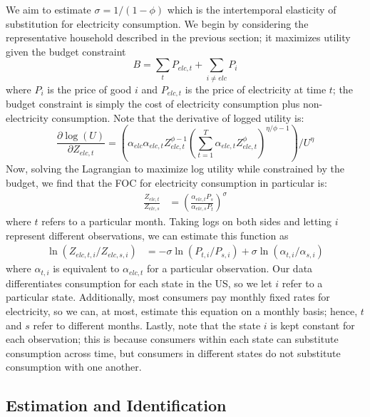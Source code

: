 \documentclass[12pt,a4paper]{extarticle}
\begin{document}
We aim to estimate $\sigma = 1/(1-\phi)$ which is the intertemporal elasticity of substitution for electricity consumption. We begin by considering the representative household described in the previous section; it maximizes utility given the budget constraint 
$$B = \sum_t P_{elc,t} + \sum_{i \neq elc} P_i $$
where $P_i$ is the price of good $i$ and $P_{elc,t}$ is the price of electricity at time $t$; the budget constraint is simply the cost of electricity consumption plus non-electricity consumption. Note that the derivative of logged utility is:
$$ \frac{\partial \log(U)}{\partial Z_{elc,t}} = \left( \alpha_{elc} \alpha_{elc,t} Z_{elc,t}^{\phi - 1}  \left( \sum_{t=1}^T \alpha_{elc,t} Z_{elc, t}^\phi \right)^{\eta/\phi -1} \right) / U^\eta$$
Now, solving the Lagrangian to maximize log utility while constrained by the budget, we find that the FOC for electricity consumption in particular is:
\begin{align*}\frac{Z_{elc, t}}{ Z_{elc, s}} &=  \left( \frac{\alpha_{elc,t} P_s}{\alpha_{elc,s} P_t}  \right)^{\sigma} 
\end{align*}
where $t$ refers to a particular month. Taking logs on both sides and letting $i$ represent different observations, we can estimate this function as 
\begin{align*}
\ln (Z_{elc, t, i} / Z_{elc, s, i}) &= -\sigma \ln (P_{t,i} / P_{s,i}) + \sigma \ln (\alpha_{t,i} / \alpha_{s,i}) 
\end{align*}
where $\alpha_{t,i}$ is equivalent to $\alpha_{elc,t}$ for a particular observation. Our data differentiates consumption for each state in the US, so we let $i$ refer to a particular state. Additionally, most consumers pay monthly fixed rates for electricity, so we can, at most, estimate this equation on a monthly basis; hence, $t$ and $s$ refer to different months. Lastly, note that the state $i$ is kept constant for each observation; this is because consumers within each state can substitute consumption across time, but consumers in different states do not substitute consumption with one another. 

\subsection{Estimation and Identification}
\end{document}
